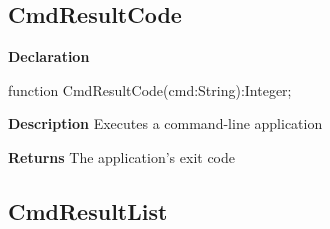 \documentclass{report}
\newif\ifpdf
\begin{document}
\subsection*{CmdResultCode}
\fi
\label{utilities-CmdResultCode}
\begin{list}{}{
\setlength{\itemindent}{0cm}
\setlength{\listparindent}{0cm}
\setlength{\leftmargin}{\evensidemargin}
\addtolength{\leftmargin}{\tmplength}
\settowidth{\labelsep}{X}
\addtolength{\leftmargin}{\labelsep}
\setlength{\labelwidth}{\tmplength}
}
\item[\textbf{Declaration}\hfill]
\ifpdf
\begin{flushleft}
\fi
\begin{ttfamily}
function CmdResultCode(cmd:String):Integer;\end{ttfamily}

\ifpdf
\end{flushleft}
\fi

\par
\item[\textbf{Description}]
Executes a command{-}line application \par
\item[\textbf{Returns}]The application's exit code


\end{list}
\ifpdf
\subsection*{\large{\textbf{CmdResultList}}\normalsize\hspace{1ex}\hrulefill}
\else
\end{document}
